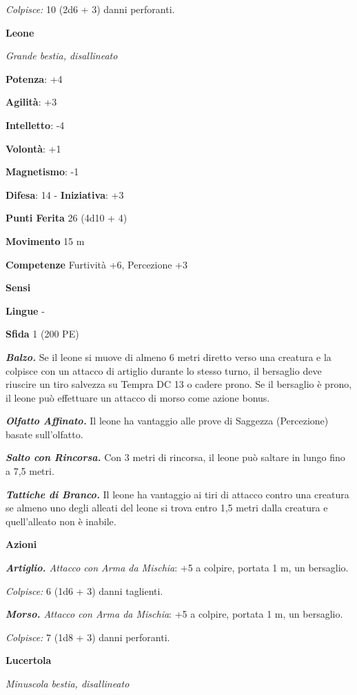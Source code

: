 \begin{multicols}{2}
\emph{Colpisce:} 10 (2d6 + 3) danni perforanti.



\textbf{Leone}

\emph{Grande bestia, disallineato}

\textbf{Potenza}: +4

\textbf{Agilità}: +3

\textbf{Intelletto}: -4

\textbf{Volontà}: +1

\textbf{Magnetismo}: -1

\textbf{Difesa}: 14 - \textbf{Iniziativa}: +3

\textbf{Punti Ferita} 26 (4d10 + 4)

\textbf{Movimento} 15 m

\textbf{Competenze} Furtività +6, Percezione +3

\textbf{Sensi} 

\textbf{Lingue} -

\textbf{Sfida} 1 (200 PE)\smallskip

\emph{\textbf{Balzo.}} Se il leone si muove di almeno 6 metri diretto
verso una creatura e la colpisce con un attacco di artiglio durante lo
stesso turno, il bersaglio deve riuscire un tiro salvezza su Tempra DC 13
o cadere prono. Se il bersaglio è prono, il leone può effettuare un
attacco di morso come azione bonus.

\emph{\textbf{Olfatto Affinato.}} Il leone ha vantaggio alle prove di
Saggezza (Percezione) basate sull'olfatto.

\emph{\textbf{Salto con Rincorsa.}} Con 3 metri di rincorsa, il leone
può saltare in lungo fino a 7,5 metri.

\emph{\textbf{Tattiche di Branco.}} Il leone ha vantaggio ai tiri di
attacco contro una creatura se almeno uno degli alleati del leone si
trova entro 1,5 metri dalla creatura e quell'alleato non è inabile.

\smallskip\textbf{Azioni}

\emph{\textbf{Artiglio.} Attacco con Arma da Mischia}: +5 a colpire,
portata 1 m, un bersaglio.

\emph{Colpisce:} 6 (1d6 + 3) danni taglienti.

\emph{\textbf{Morso.} Attacco con Arma da Mischia}: +5 a colpire,
portata 1 m, un bersaglio.

\emph{Colpisce:} 7 (1d8 + 3) danni perforanti.

\textbf{Lucertola}

\emph{Minuscola bestia, disallineato}


\end{multicols}
